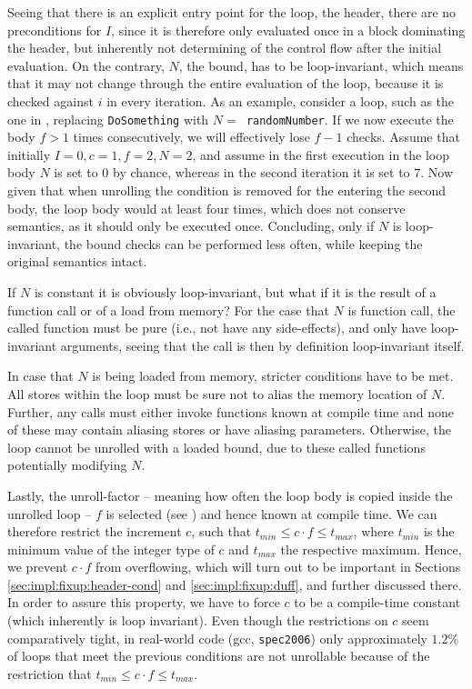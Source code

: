 Seeing that there is an explicit entry point for the loop, the header, there are no preconditions for $I$, since it is therefore only evaluated once in a block dominating the header, but inherently not determining of the control flow after the initial evaluation.
On the contrary, $N$, the bound, has to be loop-invariant, which means that it may not change through the entire evaluation of the loop, because it is checked against $i$ in every iteration.
As an example, consider a loop, such as the one in , replacing \texttt{DoSomething} with \texttt{$N =$ randomNumber}.
If we now execute the body $f > 1$ times consecutively, we will effectively lose $f - 1$ checks.
Assume that initially $I = 0, c = 1, f = 2, N = 2$, and assume in the first execution in the loop body $N$ is set to $0$ by chance, whereas in the second iteration it is set to $7$.
Now given that when unrolling the condition is removed for the entering the second body, the loop body would at least four times, which does not conserve semantics, as it should only be executed once.
Concluding, only if $N$ is loop-invariant, the bound checks can be performed less often, while keeping the original semantics intact.

If $N$ is constant it is obviously loop-invariant, but what if it is the result of a function call or of a load from memory?
For the case that $N$ is function call, the called function must be pure (i.e., not have any side-effects), and only have loop-invariant arguments, seeing that the call is then by definition loop-invariant itself.

In case that $N$ is being loaded from memory, stricter conditions have to be met.
All stores within the loop must be sure not to alias the memory location of $N$.
Further, any calls must either invoke functions known at compile time and none of these may contain aliasing stores or have aliasing parameters.
Otherwise, the loop cannot be unrolled with a loaded bound, due to these called functions potentially modifying $N$.

Lastly, the unroll-factor -- meaning how often the loop body is copied inside the unrolled loop -- $f$ is selected (see ) and hence known at compile time.
We can therefore restrict the increment $c$, such that $t_{min} \leq c \cdot f \leq t_{max}$, where $t_{min}$ is the minimum value of the integer type of $c$ and $t_{max}$ the respective maximum.
Hence, we prevent $c \cdot f$ from overflowing, which will turn out to be important in Sections \ref{sec:impl:fixup:header-cond} and \ref{sec:impl:fixup:duff}, and further discussed there.
In order to assure this property, we have to force $c$ to be a compile-time constant (which inherently is loop invariant).
Even though the restrictions on $c$ seem comparatively tight, in real-world code (gcc, \texttt{spec2006}) only approximately $1.2\%$ of loops that meet the previous conditions are not unrollable because of the restriction that  $t_{min} \leq c \cdot f \leq t_{max}$.

